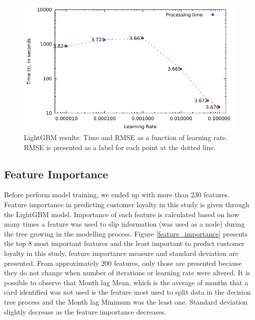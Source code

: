 \documentclass[letterpaper, 10 pt, conference]{ieeeconf}  %
\begin{document}
\begin{figure}[thpb]
\centering
\includegraphics[scale=0.7]{Figures/time.pdf}
\caption{LightGBM results: Time and RMSE as a function of learning rate. RMSE is presented as a label for each point at the dotted line.}
\label{time}
\end{figure}


\subsection{Feature Importance}
Before perform model training, we ended up with more than 230 features. Feature importance in predicting customer loyalty in this study is given through the LightGBM model. Importance of each feature is calculated based on how many times a feature was used to slip information (was used as a node) during the tree growing in the modelling process. Figure \ref{feature_importance} presents the top 8 most important features and the least important to predict customer loyalty in this study, feature importance measure and standard deviation are presented. From approximately 200 features, only those are presented because they do not change when number of iterations or learning rate were altered. It is possible to observe that Month lag Mean, which is the average of months that a card identified was not used is the feature most used to split data in the decision tree process and the Month lag Minimum was the least one. Standard deviation slightly decrease as the feature importance decreases.
\end{document}
